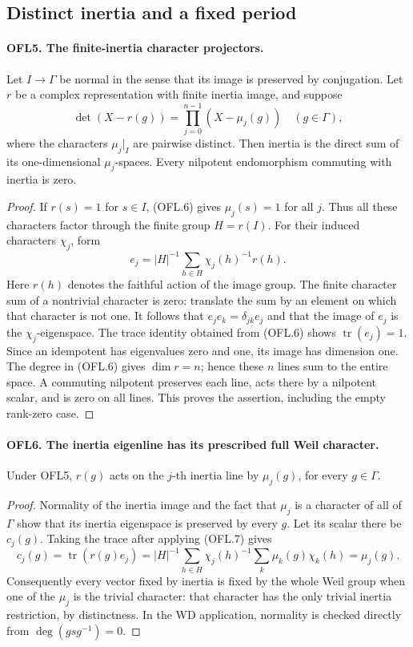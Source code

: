 \documentclass[11pt,a4paper]{article}
\numberwithin{equation}{section}
\theoremstyle{remark}\newtheorem{remark}[theorem]{Remark}
\begin{document}
\subsection{Distinct inertia and a fixed period}

\paragraph{OFL5. The finite-inertia character projectors.}
\label{claim:OFL5}
Let \(I\to\Gamma\) be normal in the sense that its image is
preserved by conjugation.  Let \(r\) be a complex representation
with finite inertia image, and suppose
\[
 \det(X-r(g))=\prod_{j=0}^{n-1}(X-\mu_j(g))
                                 \quad(g\in\Gamma),
 \tag{OFL.6}
\]
where the characters \(\mu_j|_I\) are pairwise distinct.
Then inertia is the direct sum of its one-dimensional
\(\mu_j\)-spaces.  Every nilpotent endomorphism commuting with
inertia is zero.
\begin{proof}
If \(r(s)=1\) for \(s\in I\), (OFL.6) gives
\(\mu_j(s)=1\) for all \(j\).  Thus all these characters
factor through the finite group \(H=r(I)\).  For their induced
characters \(\chi_j\), form
\[
        e_j=|H|^{-1}\sum_{h\in H}\chi_j(h)^{-1}r(h).
 \tag{OFL.7}
\]
Here \(r(h)\) denotes the faithful action of the image group.
The finite character sum of a nontrivial character is zero:
translate the sum by an element on which that character is not
one.  It follows that \(e_j e_k=\delta_{jk}e_j\) and that
the image of \(e_j\) is the \(\chi_j\)-eigenspace.
The trace identity obtained from (OFL.6) shows
\(\operatorname{tr}(e_j)=1\).  Since an idempotent has
eigenvalues zero and one, its image has dimension one.
The degree in (OFL.6) gives \(\dim r=n\); hence these \(n\)
lines sum to the entire space.  A commuting nilpotent preserves
each line, acts there by a nilpotent scalar, and is zero on all
lines.  This proves the assertion, including the empty rank-zero
case.
\end{proof}

\paragraph{OFL6. The inertia eigenline has its prescribed full Weil character.}
\label{claim:OFL6}
Under OFL5, \(r(g)\) acts on the \(j\)-th inertia line by
\(\mu_j(g)\), for every \(g\in\Gamma\).
\begin{proof}
Normality of the inertia image and the fact that \(\mu_j\)
is a character of all of \(\Gamma\) show that its inertia
eigenspace is preserved by every \(g\).  Let its scalar there
be \(c_j(g)\).  Taking the trace after applying (OFL.7) gives
\[
 c_j(g)=\operatorname{tr}(r(g)e_j)
  =|H|^{-1}\sum_{h\in H}\chi_j(h)^{-1}
                        \sum_k\mu_k(g)\chi_k(h)
  =\mu_j(g).
\]
Consequently every vector fixed by inertia is fixed by the whole
Weil group when one of the \(\mu_j\) is the trivial character:
that character has the only trivial inertia restriction, by
distinctness.  In the WD application, normality is checked directly
from \(\deg(gsg^{-1})=0\).
\end{proof}
\end{document}
